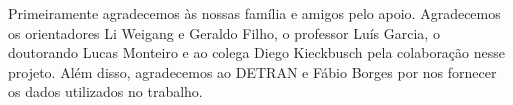Primeiramente agradecemos às nossas família e amigos pelo apoio. Agradecemos os orientadores Li Weigang e Geraldo Filho, o professor Luís Garcia, o doutorando Lucas Monteiro e ao colega Diego Kieckbusch pela colaboração nesse projeto. Além disso, agradecemos ao DETRAN e Fábio Borges por nos fornecer os dados utilizados no trabalho.
